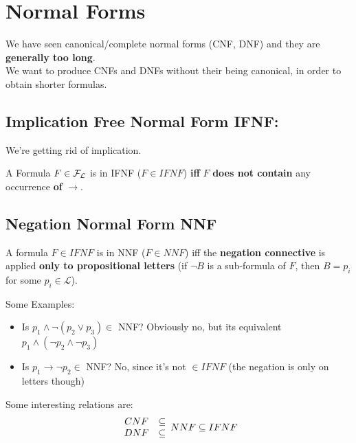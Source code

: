 	\vspace{-0.5cm}

	\section{Normal Forms}

	We have seen canonical/complete normal forms (CNF, DNF) and they are \textbf{generally too long}.\\
	We want to produce CNFs and DNFs without their being canonical, in order to obtain shorter formulas.

	\subsection{Implication Free Normal Form IFNF:}

	We're getting rid of implication.

	\begin{definition} A Formula $F \in \mathcal{F}_\mathcal{L}$ is in IFNF ($F \in IFNF$) \textbf{iff} $F$ \textbf{does not contain} any occurrence \textbf{of} $\rightarrow$.
	\end{definition}

	\subsection{Negation Normal Form NNF}

	\begin{definition} A formula $F \in IFNF$ is in NNF ($F \in NNF$) iff the \textbf{negation connective} is applied \textbf{only to propositional letters} (if $\neg B$ is a sub-formula of $F$, then $B = p_i$ for some $p_i \in \mathcal{L}$).
	 \end{definition}

	\begin{example} Some Examples:
	  \begin{itemize}
	  \item Is $p_1 \wedge \neg (p_2 \vee p_3) \in $ NNF?
		Obviously no, but its equivalent $p_1 \wedge (\neg p_2 \wedge \neg p_3)$
	  \item Is $p_1 \rightarrow \neg p_2 \in$ NNF? No, since it's not $\in IFNF$ (the negation is only on letters though)
	  \end{itemize}
	\end{example}

	\noindent
	Some interesting relations are:
	$$
	\begin{array}{c c}
		CNF & \subseteq \\
		DNF & \subseteq
	\end{array}
	NNF \subseteq IFNF
	$$

